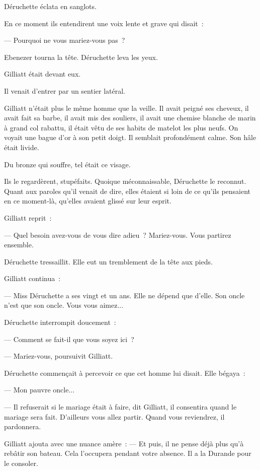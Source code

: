\documentclass[french,twoside]{book} %
\begin{document}
Déruchette éclata en sanglots.\par
 En ce moment ils entendirent une voix lente et grave qui disait :\par
— Pourquoi ne vous mariez-vous pas ?\par
Ebenezer tourna la tête. Déruchette leva les yeux.\par
Gilliatt était devant eux.\par
Il venait d’entrer par un sentier latéral.\par
Gilliatt n’était plus le même homme que la veille. Il avait peigné ses cheveux, il avait fait sa barbe, il avait mis des souliers, il avait une chemise blanche de marin à grand col rabattu, il était vêtu de ses habits de matelot les plus neufs. On voyait une bague d’or à son petit doigt. Il semblait profondément calme. Son hâle était livide.\par
Du bronze qui souffre, tel était ce visage.\par
Ils le regardèrent, stupéfaits. Quoique méconnaissable, Déruchette le reconnut. Quant aux paroles qu’il venait de dire, elles étaient si loin de ce qu’ils pensaient en ce moment-là, qu’elles avaient glissé sur leur esprit.\par
Gilliatt reprit :\par
— Quel besoin avez-vous de vous dire adieu ? Mariez-vous. Vous partirez ensemble.\par
Déruchette tressaillit. Elle eut un tremblement de la tête aux pieds.\par
Gilliatt continua :\par
— Miss Déruchette a ses vingt et un ans. Elle ne dépend que d’elle. Son oncle n’est que son oncle. Vous vous aimez...\par
Déruchette interrompit doucement :\par
— Comment se fait-il que vous soyez ici ?\par
 — Mariez-vous, poursuivit Gilliatt.\par
Déruchette commençait à percevoir ce que cet homme lui disait. Elle bégaya :\par
— Mon pauvre oncle...\par
— Il refuserait si le mariage était à faire, dit Gilliatt, il consentira quand le mariage sera fait. D’ailleurs vous allez partir. Quand vous reviendrez, il pardonnera.\par
Gilliatt ajouta avec une nuance amère : — Et puis, il ne pense déjà plus qu’à rebâtir son bateau. Cela l’occupera pendant votre absence. Il a la Durande pour le consoler.\par
\end{document}
